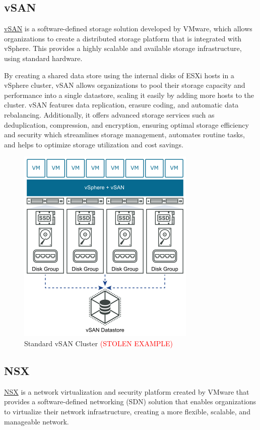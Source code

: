 \subsection{vSAN}
\href{https://docs.vmware.com/en/VMware-vSphere/7.0/com.vmware.vsphere.vsan-planning.doc/GUID-A80526C8-A941-4F84-9D44-D4B8B3914A95.html}{vSAN} is a software-defined storage solution developed by VMware, which allows organizations to create a distributed storage platform that is integrated with vSphere. This provides a highly scalable and available storage infrastructure, using standard hardware.

By creating a shared data store using the internal disks of ESXi hosts in a vSphere cluster, vSAN allows organizations to pool their storage capacity and performance into a single datastore, scaling it easily by adding more hosts to the cluster. vSAN features data replication, erasure coding, and automatic data rebalancing. Additionally, it offers advanced storage services such as deduplication, compression, and encryption, ensuring optimal storage efficiency and security which streamlines storage management, automates routine tasks, and helps to optimize storage utilization and cost savings.

\begin{figure}[H]
    \centering
    \includegraphics[scale = .8]{images/vsan-deployment.png}
    \caption{Standard vSAN Cluster \textcolor{red}{(STOLEN EXAMPLE)} }
    \label{vSan}
\end{figure}

\subsection{NSX}
\href{https://docs.vmware.com/en/VMware-NSX/index.html}{NSX} is a network virtualization and security platform created by VMware that provides a software-defined networking (SDN) solution that enables organizations to virtualize their network infrastructure, creating a more flexible, scalable, and manageable network.

